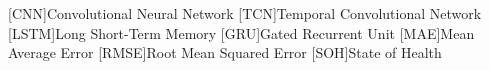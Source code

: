 \begin{acronym}
    [CNN]{Convolutional Neural Network}
    [TCN]{Temporal Convolutional Network}
    [LSTM]{Long Short-Term Memory}
    [GRU]{Gated Recurrent Unit}
    [MAE]{Mean Average Error}
    [RMSE]{Root Mean Squared Error}
    [SOH]{State of Health}
\end{acronym}
